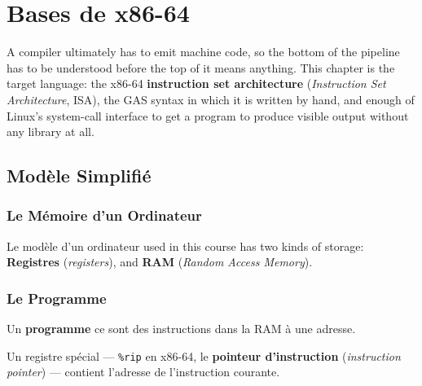 \section{Bases de x86-64}
A compiler ultimately has to emit machine code, so the bottom of the pipeline
has to be understood before the top of it means anything. This chapter is the
target language: the x86-64 \textbf{instruction set architecture}
(\textit{Instruction Set Architecture}, ISA), the GAS syntax in which it is
written by hand, and enough of Linux's system-call interface to get a program
to produce visible output without any library at all.

\subsection{Modèle Simplifié}
\subsubsection{Le Mémoire d'un Ordinateur}
Le modèle d'un ordinateur used in this course has two kinds of storage:
\textbf{Registres} (\textit{registers}), and \textbf{RAM} (\textit{Random Access Memory}). 

\begin{figure}[h!]
  \centering
\end{figure}

\subsubsection{Le Programme}
\begin{definition}[Programme]
  Un \textbf{programme} ce sont des instructions dans la RAM à une adresse.
\end{definition}
Un registre spécial --- \verb|%rip| en x86-64, le \textbf{pointeur d'instruction}
(\textit{instruction pointer}) --- contient l'adresse de l'instruction courante.\\

